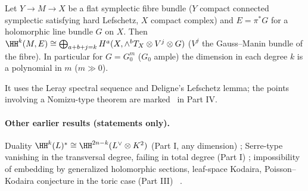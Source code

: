 \begin{thm}\label{thm:L}
Let $Y\to M\to X$ be a flat symplectic fibre bundle ($Y$ compact connected symplectic satisfying hard Lefschetz, $X$ compact complex) and $E=\pi^*G$ for a holomorphic line bundle $G$ on $X$. Then $\HH^k(M,E)\cong\bigoplus_{a+b+j=k}H^a(X,\wedge^bT_X\otimes V^j\otimes G)$ ($V^j$ the Gauss--Manin bundle of the fibre). In particular for $G=G_0^m$ ($G_0$ ample) the dimension in each degree $k$ is a polynomial in $m$ ($m\gg0$).
\end{thm}
It uses the Leray spectral sequence and Deligne's Lefschetz lemma; the points involving a Nomizu-type theorem are marked \tQ\ in Part IV.

\paragraph{Other earlier results (statements only).} Duality $\HH^k(L)^*\cong\HH^{2n-k}(L^\vee\otimes K^2)$ (Part I, any dimension) \tP; Serre-type vanishing in the transversal degree, failing in total degree (Part I) \tP; impossibility of embedding by generalized holomorphic sections, leaf-space Kodaira, Poisson--Kodaira conjecture in the toric case (Part III) \tP\ \tK.

